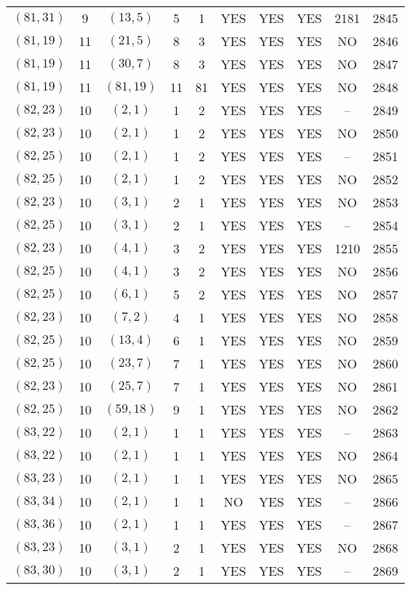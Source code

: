 \begin{longtable}{|c|c|c|c|c|c|c|c|c|c|}
$(81, 31)$ & 9 & $(13, 5)$ & 5 & 1 & YES & YES & YES & 2181 & 2845\\
$(81, 19)$ & 11 & $(21, 5)$ & 8 & 3 & YES & YES & YES & NO & 2846\\
$(81, 19)$ & 11 & $(30, 7)$ & 8 & 3 & YES & YES & YES & NO & 2847\\
$(81, 19)$ & 11 & $(81, 19)$ & 11 & 81 & YES & YES & YES & NO & 2848\\
$(82, 23)$ & 10 & $(2, 1)$ & 1 & 2 & YES & YES & YES & -- & 2849\\
$(82, 23)$ & 10 & $(2, 1)$ & 1 & 2 & YES & YES & YES & NO & 2850\\
$(82, 25)$ & 10 & $(2, 1)$ & 1 & 2 & YES & YES & YES & -- & 2851\\
$(82, 25)$ & 10 & $(2, 1)$ & 1 & 2 & YES & YES & YES & NO & 2852\\
$(82, 23)$ & 10 & $(3, 1)$ & 2 & 1 & YES & YES & YES & NO & 2853\\
$(82, 25)$ & 10 & $(3, 1)$ & 2 & 1 & YES & YES & YES & -- & 2854\\
$(82, 23)$ & 10 & $(4, 1)$ & 3 & 2 & YES & YES & YES & 1210 & 2855\\
$(82, 25)$ & 10 & $(4, 1)$ & 3 & 2 & YES & YES & YES & NO & 2856\\
$(82, 25)$ & 10 & $(6, 1)$ & 5 & 2 & YES & YES & YES & NO & 2857\\
$(82, 23)$ & 10 & $(7, 2)$ & 4 & 1 & YES & YES & YES & NO & 2858\\
$(82, 25)$ & 10 & $(13, 4)$ & 6 & 1 & YES & YES & YES & NO & 2859\\
$(82, 25)$ & 10 & $(23, 7)$ & 7 & 1 & YES & YES & YES & NO & 2860\\
$(82, 23)$ & 10 & $(25, 7)$ & 7 & 1 & YES & YES & YES & NO & 2861\\
$(82, 25)$ & 10 & $(59, 18)$ & 9 & 1 & YES & YES & YES & NO & 2862\\
$(83, 22)$ & 10 & $(2, 1)$ & 1 & 1 & YES & YES & YES & -- & 2863\\
$(83, 22)$ & 10 & $(2, 1)$ & 1 & 1 & YES & YES & YES & NO & 2864\\
$(83, 23)$ & 10 & $(2, 1)$ & 1 & 1 & YES & YES & YES & NO & 2865\\
$(83, 34)$ & 10 & $(2, 1)$ & 1 & 1 & NO & YES & YES & -- & 2866\\
$(83, 36)$ & 10 & $(2, 1)$ & 1 & 1 & YES & YES & YES & -- & 2867\\
$(83, 23)$ & 10 & $(3, 1)$ & 2 & 1 & YES & YES & YES & NO & 2868\\
$(83, 30)$ & 10 & $(3, 1)$ & 2 & 1 & YES & YES & YES & -- & 2869\\

\end{longtable}

